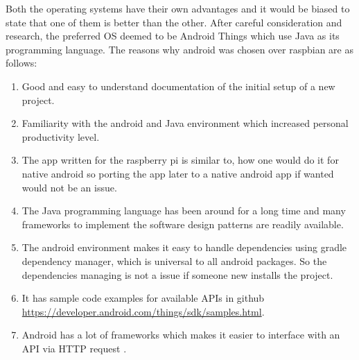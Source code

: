         \newpage 
        \par
            Both the operating systems have their own advantages and it would be biased to state that
            one of them is better than the other. After careful consideration and research, the
            preferred OS deemed to be Android Things \cite{androidThings} which use Java as its
            programming language. The reasons why android was chosen over raspbian are as follows:
            \begin{enumerate}
                \item 
                    Good and easy to understand documentation of the initial setup 
                    of a new project.
                \item 
                    Familiarity with the android and Java environment which increased personal
                    productivity level.  
                \item 
                    The app written for the raspberry pi is similar to, how one would
                    do it for native android so porting the app later to a native android
                    app if wanted would not be an issue. 
                \item 
                    The Java programming language has been around for a long time and many
                    frameworks to implement the software design patterns are readily 
                    available.
                \item 
                    The android environment makes it easy to handle dependencies using gradle 
                    \cite{Gradle}
                    dependency manager, which is universal to all android packages. So the 
                    dependencies managing is not a issue if someone new installs the project.  
                \item
                    It has sample code examples for available APIs in github 
                    \url{https://developer.android.com/things/sdk/samples.html}. 
                \item
                    Android has a lot of frameworks which makes it easier to interface with an
                    API via HTTP request \cite{http}.
            \end{enumerate}